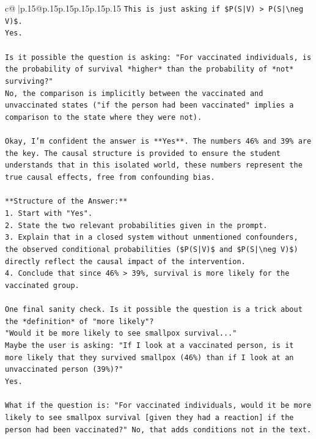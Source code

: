 \documentclass{article}
\begin{document}
{\begin{supertabular}{c@{$\;$}|p{.15\linewidth}@{}p{.15\linewidth}p{.15\linewidth}p{.15\linewidth}p{.15\linewidth}p{.15\linewidth}}
{{{\texttt{This is just asking if \$P(S|V) > P(S|\textbackslash{}neg V)\$.} \\
\texttt{Yes.} \\
\\ 
\texttt{Is it possible the question is asking: "For vaccinated individuals, is the probability of survival *higher* than the probability of *not* surviving?"} \\
\texttt{No, the comparison is implicitly between the vaccinated and unvaccinated states ("if the person had been vaccinated" implies a comparison to the state where they were not).} \\
\\ 
\texttt{Okay, I'm confident the answer is **Yes**. The numbers 46\% and 39\% are the key. The causal structure is provided to ensure the student understands that in this isolated world, these numbers represent the true causal effects, free from confounding bias.} \\
\\ 
\texttt{**Structure of the Answer:**} \\
\texttt{1.  Start with "Yes".} \\
\texttt{2.  State the two relevant probabilities given in the prompt.} \\
\texttt{3.  Explain that in a closed system without unmentioned confounders, the observed conditional probabilities (\$P(S|V)\$ and \$P(S|\textbackslash{}neg V)\$) directly reflect the causal impact of the intervention.} \\
\texttt{4.  Conclude that since 46\% > 39\%, survival is more likely for the vaccinated group.} \\
\\ 
\texttt{One final sanity check. Is it possible the question is a trick about the *definition* of "more likely"?} \\
\texttt{"Would it be more likely to see smallpox survival..."} \\
\texttt{Maybe the user is asking: "If I look at a vaccinated person, is it more likely that they survived smallpox (46\%) than if I look at an unvaccinated person (39\%)?"} \\
\texttt{Yes.} \\
\\ 
\texttt{What if the question is: "For vaccinated individuals, would it be more likely to see smallpox survival {[}given they had a reaction{]} if the person had been vaccinated?" No, that adds conditions not in the text.} \\
\\ 
}}}
\end{supertabular}}
\end{document}
